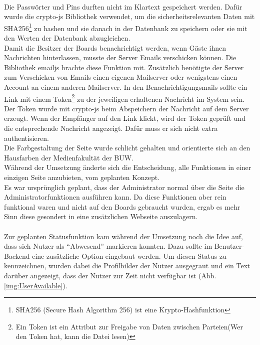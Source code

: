 \\
Die Passwörter und Pins durften nicht im Klartext gespeichert werden.
Dafür wurde die crypto-js Bibliothek verwendet, um die sicherheitsrelevanten Daten mit SHA256\footnote{SHA256 (Secure Hash Algorithm 256) ist eine Krypto-Hashfunktion} zu hashen und sie danach in der Datenbank zu speichern oder sie mit den Werten der Datenbank abzugleichen.
\\
Damit die Besitzer der Boards benachrichtigt werden, wenn Gäste ihnen Nachrichten hinterlassen, musste der Server Emails verschicken können.
Die Bibliothek emailjs brachte diese Funktion mit. Zusätzlich benötigte der Server zum Verschicken von Emails einen eigenen Mailserver oder wenigstens einen Account an einem anderen Mailserver.
In den Benachrichtigungsmails sollte ein Link mit einem Token\footnote{Ein Token ist ein Attribut zur Freigabe von Daten zwischen Parteien(Wer den Token hat, kann die Datei lesen)} zu der jeweiligen erhaltenen Nachricht im System sein. Der Token wurde mit crypto-js beim Abspeichern der Nachricht auf dem Server erzeugt. Wenn der Empfänger auf den Link klickt, wird der Token geprüft und die entsprechende Nachricht angezeigt. Dafür muss er sich nicht extra authentisieren.
\\
Die Farbgestaltung der Seite wurde schlicht gehalten und orientierte sich an den Hausfarben der Medienfakultät der BUW.
\\
Während der Umsetzung änderte sich die Entscheidung, alle Funktionen in einer einzigen Seite anzubieten, vom geplanten Konzept.
\\
Es war ursprünglich geplant, dass der Administrator normal über die Seite die Administratorfunktionen ausführen kann. Da diese Funktionen aber rein funktional waren und nicht auf den Boards gebraucht wurden, ergab es mehr Sinn diese gesondert in eine zusätzlichen Webseite auszulagern.
\\
\\
Zur geplanten Statusfunktion kam während der Umsetzung noch die Idee auf, dass sich Nutzer als ``Abwesend'' markieren konnten. Dazu sollte im Benutzer-Backend eine zusätzliche Option eingebaut werden. Um diesen Status zu kennzeichnen, wurden dabei die Profilbilder der Nutzer ausgegraut und ein Text darüber angezeigt, dass der Nutzer zur Zeit nicht verfügbar ist (Abb. \ref{img:UserAvailable}).
